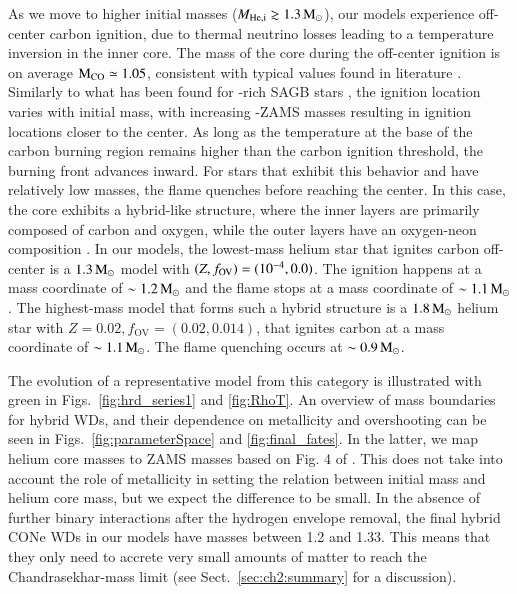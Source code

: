\documentclass[main.tex]{subfiles}
\begin{document}
As we move to higher initial masses ($M_{\rm{He, i}}\gtrsim 1.3\mathrm{\,M_\odot}$), our models experience off-center carbon ignition, due to thermal neutrino losses leading to a temperature inversion in the inner core. The mass of the core during the off-center ignition is on average $\rm M_{CO} \simeq 1.05$\msun, consistent  with  typical values found in literature \citep[e.g.,][]{doherty2015}. Similarly to what has been found for -rich SAGB stars \citep[e.g.,][]{Garcia1997,Gil-Pons:2003sep,siess2006,Poelarends:2007ip,Doherty:2010slg,Farmer:2015afs}, the ignition location 
varies with initial mass, with increasing -ZAMS masses resulting in ignition locations closer to the center. 
As long as the temperature at the base of the carbon burning region remains higher than the carbon ignition threshold, the 
burning front advances inward.  For stars that exhibit this behavior and have relatively low masses, the flame quenches before reaching the center.
In this case, the core exhibits a hybrid-like structure, where the inner layers are primarily composed of carbon and oxygen, while the outer layers have an oxygen-neon composition \citep[for a detailed discussion on the flame quenching mechanisms we refer to the work of][]{Siess2009, Denissenkov:2013qaa, chen2014b, Farmer:2015afs}. 
In our \seriesone models, the lowest-mass helium star that ignites carbon off-center is a $1.3\mathrm{\,M_\odot}$ model with $(Z,f_{\rm OV})=(10^{-4},0.0)$. The ignition happens at a mass coordinate of $\sim 1.2\mathrm{\,M_\odot}$ and the flame stops at a mass coordinate of $\sim 1.1\mathrm{\,M_\odot}$. The highest-mass model that forms such a hybrid structure is a $1.8\mathrm{\,M_\odot}$ helium star with $Z=0.02,f_{\text{OV}} = (0.02,0.014)$, that ignites carbon at a  mass coordinate of $\sim 1.1\mathrm{\,M_\odot}$. The flame quenching occurs at $\sim 0.9\mathrm{\,M_\odot}$. 

The evolution of a representative model from this category is illustrated with green in Figs.~\ref{fig:hrd_series1} and \ref{fig:RhoT}. An overview of mass boundaries for hybrid WDs, and their dependence on metallicity and overshooting can be seen in Figs.~\ref{fig:parameterSpace} and \ref{fig:final_fates}. 
In the latter, we map helium core masses to ZAMS masses based on Fig. 4 of \cite{Farmer:2015afs}. This does not take into account the role of metallicity in setting the relation between initial mass and helium core mass, but we expect the difference to be small. In the absence of further binary interactions after the hydrogen envelope removal, the final hybrid CONe WDs in our models have masses between 1.2 and 1.33\msun. This means that they only need to accrete very small amounts of matter to reach the Chandrasekhar-mass limit (see Sect.~\ref{sec:ch2:summary} for a discussion). 
\end{document}
